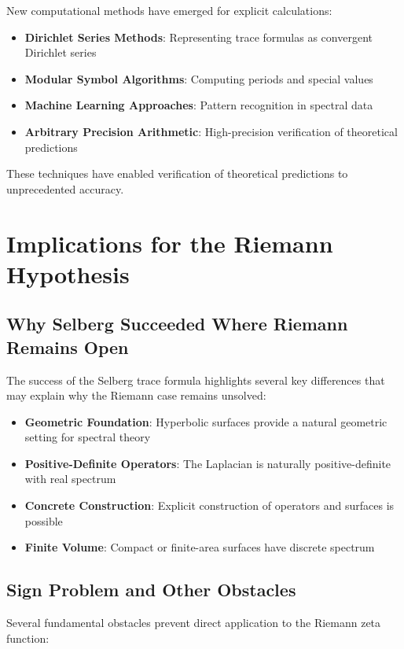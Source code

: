 New computational methods have emerged for explicit calculations:

\begin{itemize}
\item \textbf{Dirichlet Series Methods}: Representing trace formulas as convergent Dirichlet series
\item \textbf{Modular Symbol Algorithms}: Computing periods and special values
\item \textbf{Machine Learning Approaches}: Pattern recognition in spectral data
\item \textbf{Arbitrary Precision Arithmetic}: High-precision verification of theoretical predictions
\end{itemize}

These techniques have enabled verification of theoretical predictions to unprecedented accuracy.

\section{Implications for the Riemann Hypothesis}
\label{sec:rh_implications}

\subsection{Why Selberg Succeeded Where Riemann Remains Open}

The success of the Selberg trace formula highlights several key differences that may explain why the Riemann case remains unsolved:

\begin{itemize}
\item \textbf{Geometric Foundation}: Hyperbolic surfaces provide a natural geometric setting for spectral theory
\item \textbf{Positive-Definite Operators}: The Laplacian is naturally positive-definite with real spectrum
\item \textbf{Concrete Construction}: Explicit construction of operators and surfaces is possible
\item \textbf{Finite Volume}: Compact or finite-area surfaces have discrete spectrum
\end{itemize}

\subsection{Sign Problem and Other Obstacles}

Several fundamental obstacles prevent direct application to the Riemann zeta function:

